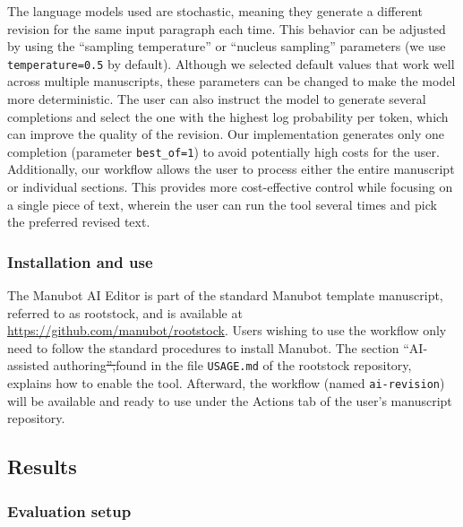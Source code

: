 \documentclass[
]{article}
\providecommand{\DIFaddtex}[1]{{\protect\color{blue}\uwave{#1}}} %
\providecommand{\DIFdeltex}[1]{{\protect\color{red}\sout{#1}}}                      %
\providecommand{\DIFaddbegin}{} %
\providecommand{\DIFaddend}{} %
\providecommand{\DIFdelbegin}{} %
\providecommand{\DIFdelend}{} %
\providecommand{\DIFadd}[1]{\texorpdfstring{\DIFaddtex{#1}}{#1}} %
\providecommand{\DIFdel}[1]{\texorpdfstring{\DIFdeltex{#1}}{}} %
\newcommand{\DIFscaledelfig}{0.5}
\newlength{\DIFdelgraphicswidth} %
\newlength{\DIFdelgraphicsheight} %
\newcommand{\DIFaddincludegraphics}[2][]{{\color{blue}\fbox{\DIFOincludegraphics[#1]{#2}}}} %
\newcommand{\DIFdelincludegraphics}[2][]{%
\sbox{\DIFdelgraphicsbox}{\DIFOincludegraphics[#1]{#2}}%
\settoboxwidth{\DIFdelgraphicswidth}{\DIFdelgraphicsbox} %
\settoboxtotalheight{\DIFdelgraphicsheight}{\DIFdelgraphicsbox} %
\scalebox{\DIFscaledelfig}{%
\parbox[b]{\DIFdelgraphicswidth}{\usebox{\DIFdelgraphicsbox}\\[-\baselineskip] \rule{\DIFdelgraphicswidth}{0em}}\llap{\resizebox{\DIFdelgraphicswidth}{\DIFdelgraphicsheight}{%
\setlength{\unitlength}{\DIFdelgraphicswidth}%
\begin{picture}(1,1)%
\thicklines\linethickness{2pt} %
{\color[rgb]{1,0,0}\put(0,0){\framebox(1,1){}}}%
{\color[rgb]{1,0,0}\put(0,0){\line( 1,1){1}}}%
{\color[rgb]{1,0,0}\put(0,1){\line(1,-1){1}}}%
\end{picture}%
}\hspace*{3pt}}} %
} %
\DeclareRobustCommand{\DIFaddbegin}{\DIFOaddbegin \let\includegraphics\DIFaddincludegraphics} %
\DeclareRobustCommand{\DIFaddend}{\DIFOaddend \let\includegraphics\DIFOincludegraphics} %
\DeclareRobustCommand{\DIFdelbegin}{\DIFOdelbegin \let\includegraphics\DIFdelincludegraphics} %
\DeclareRobustCommand{\DIFdelend}{\DIFOaddend \let\includegraphics\DIFOincludegraphics} %
\begin{document}
The language models used are stochastic, meaning they generate a different revision for the same input paragraph each time.
This behavior can be adjusted by using the ``sampling temperature'' or ``nucleus sampling'' parameters (we use \texttt{temperature=0.5} by default).
Although we selected default values that work well across multiple manuscripts, these parameters can be changed to make the model more deterministic.
The user can also instruct the model to generate several completions and select the one with the highest log probability per token, which can improve the quality of the revision.
Our implementation generates only one completion (parameter \texttt{best\_of=1}) to avoid potentially high costs for the user.
Additionally, our workflow allows the user to process either the entire manuscript or individual sections.
This provides more cost-effective control while focusing on a single piece of text, wherein the user can run the tool several times and pick the preferred revised text.

\subsubsection{Installation and use}

The Manubot AI Editor is part of the standard Manubot template manuscript, referred to as rootstock, and is available at \url{https://github.com/manubot/rootstock}.
Users wishing to use the workflow only need to follow the standard procedures to install Manubot.
The section ``AI-assisted authoring\DIFdelbegin \DIFdel{'',}\DIFdelend \DIFaddbegin \DIFadd{,'' }\DIFaddend found in the file \texttt{USAGE.md} of the rootstock repository, explains how to enable the tool.
Afterward, the workflow (named \texttt{ai-revision}) will be available and ready to use under the Actions tab of the user's manuscript repository.

\subsection{Results}

\subsubsection{Evaluation setup}
\end{document}

